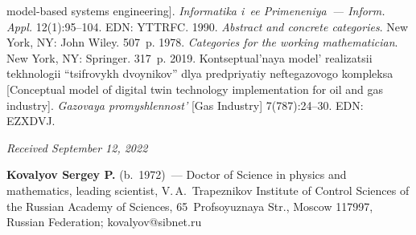 \begin{multicols}{2}
{{\begin{thebibliography}{99}
model-based systems engineering]. \textit{Informatika i~ee Primeneniya~--- Inform. Appl.} 
 12(1):95--104. EDN: \mbox{YTTRFC}.
    1990. \textit{Abstract 
and concrete categories}. New York, NY: John Wiley. 507~p.
    1978. \textit{Categories for the working mathematician}. New York, NY: 
Springer. 317~p.
    2019. Kontseptual'naya 
model' realizatsii tekhnologii ``tsifrovykh dvoynikov'' dlya predpriyatiy neftegazovogo kompleksa 
[Conceptual model of digital twin technology implementation for oil and gas industry]. 
\textit{Gazovaya promyshlennost'} [Gas Industry] 7(787):24--30. EDN: EZXDVJ.
   
 \end{thebibliography}

 }
 }

\end{multicols}

\vspace*{-6pt}

\hfill{\small\textit{Received September 12, 2022}} 

\vspace*{-18pt}
     
     \Contrl
     
     \vspace*{-3pt}
   
   \noindent
   \textbf{Kovalyov Sergey P.} (b.\ 1972)~--- Doctor of Science in physics and mathematics, 
leading scientist, V.\,A.~Trapeznikov Institute of Control Sciences of the Russian Academy of Sciences, 
65~Profsoyuznaya Str., Moscow 117997, Russian Federation; \mbox{kovalyov@sibnet.ru}
   


\label{end\stat}

\renewcommand{\bibname}{\protect\rm Литература} 

   